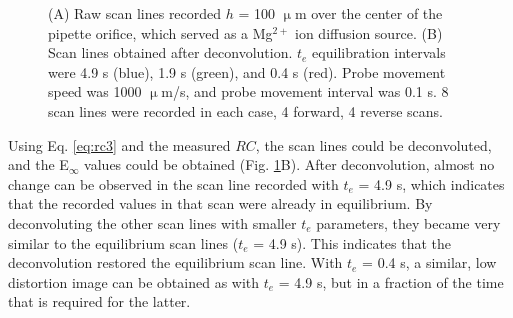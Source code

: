 \begin{figure}%
\centering
{}

\caption[Raw, and deconvoluted linescans conducted with the Mg$^{2+}$ ISME]{(A) Raw scan lines recorded $h$ = 100 $\upmu$m over the center of the pipette orifice, which served as a Mg$^{2+}$ ion diffusion source.
(B) Scan lines obtained after deconvolution.
$t_e$ equilibration intervals were 4.9 s (blue), 1.9 s (green), and 0.4 s (red).
Probe movement speed was 1000 $\upmu$m/s, and probe movement interval was 0.1 s.
8 scan lines were recorded in each case, 4 forward, 4 reverse scans.}
\label{fig:lines}
\end{figure}


Using Eq. \ref{eq:rc3} and the measured $RC$, the scan lines could be deconvoluted, and the E$_{\infty}$ values could be obtained (Fig. \ref{fig:lines}B).
After deconvolution, almost no change can be observed in the scan line recorded with $t_e$ = 4.9 s, which indicates that the recorded values in that scan were already in equilibrium.
By deconvoluting the other scan lines with smaller $t_e$ parameters, they became very similar to the equilibrium scan lines ($t_e$ = 4.9 s).
This indicates that the deconvolution restored the equilibrium scan line.
With $t_e$ = 0.4 s, a similar, low distortion image can be obtained as with $t_e$ = 4.9 s, but in a fraction of the time that is required for the latter.

